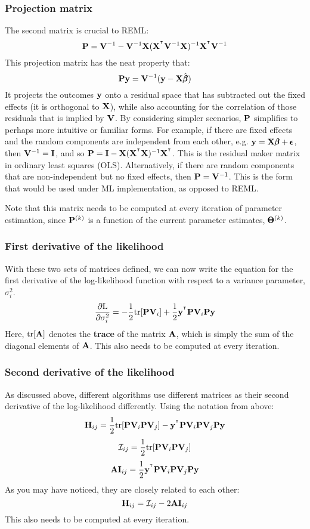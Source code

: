 \documentclass[12pt]{article}
\begin{document}
\subsubsection{Projection matrix}
The second matrix is crucial to REML:
$$
\mathbf{P} = \mathbf{V}^{-1} -
\mathbf{V}^{-1} \mathbf{X} (\mathbf{X}^{^\intercal} \mathbf{V}^{-1} \mathbf{X})^{-1} \mathbf{X}^{^\intercal} \mathbf{V}^{-1}
$$
This projection matrix has the neat property that:
$$ \mathbf{P} \mathbf{y} = \mathbf{V}^{-1} (\mathbf{y} - \mathbf{X} \hat{\pmb{\beta}}) $$
It projects the outcomes $\mathbf{y}$ onto a residual space that has subtracted out the fixed effects (it is orthogonal to $\mathbf{X}$), while also accounting for the correlation of those residuals that is implied by $\mathbf{V}$.
By considering simpler scenarios, $\mathbf{P}$ simplifies to perhaps more intuitive or familiar forms.
For example, if there are fixed effects and the random components are independent from each other, e.g. $\mathbf{y} = \mathbf{X} \pmb{\beta} + \pmb{\epsilon}$, then $\mathbf{V}^{-1} = \mathbf{I}$, and so $\mathbf{P} = \mathbf{I} - \mathbf{X} (\mathbf{X}^{^\intercal} \mathbf{X})^{-1} \mathbf{X}^{^\intercal}$.
This is the residual maker matrix in ordinary least squares (OLS).
Alternatively, if there are random components that are non-independent but no fixed effects, then $\mathbf{P} = \mathbf{V}^{-1}$.
This is the form that would be used under ML implementation, as opposed to REML.

Note that this matrix needs to be computed at every iteration of parameter estimation, since $\mathbf{P}^{(k)}$ is a function of the current parameter estimates, $\pmb{\Theta}^{(k)}$.

\subsubsection{First derivative of the likelihood}
With these two sets of matrices defined, we can now write the equation for the first derivative of the log-likelihood function with respect to a variance parameter, $\sigma^2_i$.
$$
\frac{\partial \mathrm{L}}{\partial \sigma^2_i} =
- \frac{1}{2} \mathrm{tr}[\mathbf{P} \mathbf{V}_i] +
\frac{1}{2} \mathbf{y}^{^\intercal} \mathbf{P} \mathbf{V}_i \mathbf{P} \mathbf{y}
$$
Here, $\mathrm{tr}[\mathbf{A}]$ denotes the \textbf{trace} of the matrix $\mathbf{A}$, which is simply the sum of the diagonal elements of $\mathbf{A}$.
This also needs to be computed at every iteration.

\subsubsection{Second derivative of the likelihood}
As discussed above, different algorithms use different matrices as their second derivative of the log-likelihood differently.
Using the notation from above:
$$ \mathbf{H}_{ij} =
\frac{1}{2} \mathrm{tr}[\mathbf{P} \mathbf{V}_i \mathbf{P} \mathbf{V}_j] - 
\mathbf{y}^{^\intercal} \mathbf{P} \mathbf{V}_i \mathbf{P} \mathbf{V}_j \mathbf{P} \mathbf{y}
$$
$$ \mathcal{I}_{ij} =
\frac{1}{2} \mathrm{tr}[\mathbf{P} \mathbf{V}_i \mathbf{P} \mathbf{V}_j]
$$
$$ \mathbf{AI}_{ij} =
\frac{1}{2}
\mathbf{y}^{^\intercal} \mathbf{P} \mathbf{V}_i \mathbf{P} \mathbf{V}_j \mathbf{P} \mathbf{y}
$$
As you may have noticed, they are closely related to each other:
$$
\mathbf{H}_{ij} = \mathcal{I}_{ij} - 2 \mathbf{AI}_{ij}
$$
This also needs to be computed at every iteration.
\end{document}
